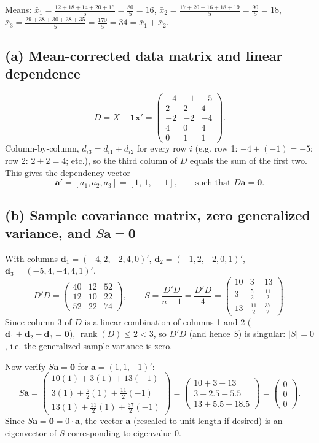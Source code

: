 \documentclass[11pt]{article}
\begin{document}
Means: $\bar x_1=\frac{12+18+14+20+16}{5}=\frac{80}{5}=16$, $\bar x_2=\frac{17+20+16+18+19}{5}=\frac{90}{5}=18$, $\bar x_3=\frac{29+38+30+38+35}{5}=\frac{170}{5}=34=\bar x_1+\bar x_2$.

\subsection*{(a) Mean-corrected data matrix and linear dependence}
\[
D=X-\bm 1\bar{\bm x}'=\begin{pmatrix}-4 & -1 & -5\\ 2 & 2 & 4\\ -2 & -2 & -4\\ 4 & 0 & 4\\ 0 & 1 & 1\end{pmatrix}.
\]
Column-by-column, $d_{i3}=d_{i1}+d_{i2}$ for every row $i$ (e.g. row 1: $-4+(-1)=-5$; row 2: $2+2=4$; etc.), so the third column of $D$ equals the sum of the first two. This gives the dependency vector
\[
\bm a'=[a_1,a_2,a_3]=[1,\,1,\,-1], \qquad \text{such that } D\bm a=\bm 0.
\]

\subsection*{(b) Sample covariance matrix, zero generalized variance, and $S\bm a=\bm 0$}
With columns $\bm d_1=(-4,2,-2,4,0)'$, $\bm d_2=(-1,2,-2,0,1)'$, $\bm d_3=(-5,4,-4,4,1)'$,
\[
D'D=\begin{pmatrix}40 & 12 & 52\\ 12 & 10 & 22\\ 52 & 22 & 74\end{pmatrix}, \qquad S=\frac{D'D}{n-1}=\frac{D'D}{4}=\begin{pmatrix}10 & 3 & 13\\ 3 & \tfrac52 & \tfrac{11}{2}\\ 13 & \tfrac{11}{2} & \tfrac{37}{2}\end{pmatrix}.
\]
Since column 3 of $D$ is a linear combination of columns 1 and 2 ($\bm d_1+\bm d_2-\bm d_3=\bm 0$), $\operatorname{rank}(D)\le2<3$, so $D'D$ (and hence $S$) is singular: $|S|=0$, i.e. the generalized sample variance is zero.

Now verify $S\bm a=\bm 0$ for $\bm a=(1,1,-1)'$:
\[
S\bm a=\begin{pmatrix}10(1)+3(1)+13(-1)\\ 3(1)+\tfrac52(1)+\tfrac{11}{2}(-1)\\ 13(1)+\tfrac{11}{2}(1)+\tfrac{37}{2}(-1)\end{pmatrix}=\begin{pmatrix}10+3-13\\ 3+2.5-5.5\\ 13+5.5-18.5\end{pmatrix}=\begin{pmatrix}0\\0\\0\end{pmatrix}.
\]
Since $S\bm a=\bm 0=0\cdot\bm a$, the vector $\bm a$ (rescaled to unit length if desired) is an eigenvector of $S$ corresponding to eigenvalue $0$.
\end{document}

